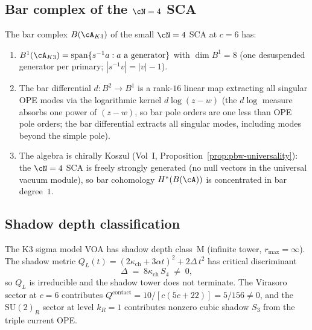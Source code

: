 \subsection{Bar complex of the \texorpdfstring{$\cN = 4$}{cN = 4} SCA}
\label{subsec:bar-n4}

\begin{proposition}
\label{prop:bar-n4-sca}
The bar complex $B(\cA_{K3})$ of the small $\cN = 4$ SCA at
$c = 6$ has:
\begin{enumerate}[label=\textup{(\roman*)}]
\item $B^1(\cA_{K3}) = \mathrm{span}\{s^{-1}a : a \text{ a
 generator}\}$ with $\dim B^1 = 8$
 \textup{(}one desuspended generator per primary;
 $|s^{-1}v| = |v| - 1$\textup{)}.
\item The bar differential $d\colon B^2 \to B^1$ is a
 rank-$16$ linear map extracting all singular OPE modes via
 the logarithmic kernel $d\log(z-w)$ \textup{(}the $d\log$
 measure absorbs one power of $(z-w)$, so bar pole orders are
 one less than OPE pole orders; the bar differential extracts
 all singular modes, including modes beyond the simple pole\textup{)}.
\item The algebra is chirally Koszul
 \textup{(}Vol~I, Proposition~\textup{\ref{prop:pbw-universality}}):
 the $\cN = 4$ SCA is freely strongly generated \textup{(}no null
 vectors in the universal vacuum module\textup{)}, so bar
 cohomology $H^*(B(\cA))$ is concentrated in bar degree~$1$.
\end{enumerate}
\end{proposition}

\subsection{Shadow depth classification}
\label{subsec:shadow-depth-k3}

\begin{proposition}
\label{prop:shadow-class-k3}
The K3 sigma model VOA has shadow depth class~M
\textup{(}infinite tower, $r_{\max} = \infty$\textup{)}.
The shadow metric
$Q_L(t) = (2\kappa_{\mathrm{ch}} + 3\alpha t)^2 + 2\Delta\,t^2$ has
critical discriminant
\[
\Delta \;=\; 8\kappa_{\mathrm{ch}}\,S_4 \;\neq\; 0,
\]
so $Q_L$ is irreducible and the shadow tower does not terminate.
The Virasoro sector at $c = 6$ contributes
$Q^{\mathrm{contact}} = 10/[c(5c+22)] = 5/156 \neq 0$, and the
$\mathrm{SU}(2)_R$ sector at level $k_R = 1$ contributes nonzero
cubic shadow $S_3$ from the triple current OPE.
\end{proposition}

